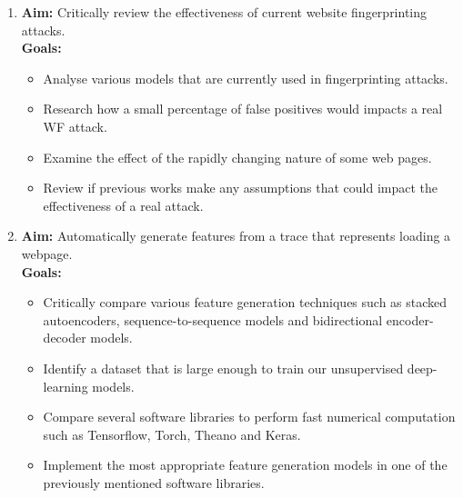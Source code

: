 \begin{enumerate}
   \item \textbf{Aim:} Critically review the effectiveness of current website fingerprinting attacks.\\
   \textbf{Goals:}
   \begin{itemize}
      \item Analyse various models that are currently used in fingerprinting attacks.
      \item Research how a small percentage of false positives would impacts a real WF attack.
      \item Examine the effect of the rapidly changing nature of some web pages.
      \item Review if previous works make any assumptions that could impact the effectiveness of a real attack.
   \end{itemize}

   \item \textbf{Aim:} Automatically generate features from a trace that represents loading a webpage.\\
   \textbf{Goals:}
   \begin{itemize}
      \item Critically compare various feature generation techniques such as stacked autoencoders, sequence-to-sequence models and bidirectional encoder-decoder models.
      \item Identify a dataset that is large enough to train our unsupervised deep-learning models.
      \item Compare several software libraries to perform fast numerical computation such as Tensorflow, Torch, Theano and Keras.
      \item Implement the most appropriate feature generation models in one of the previously mentioned software libraries.
   \end{itemize}


\end{enumerate}
